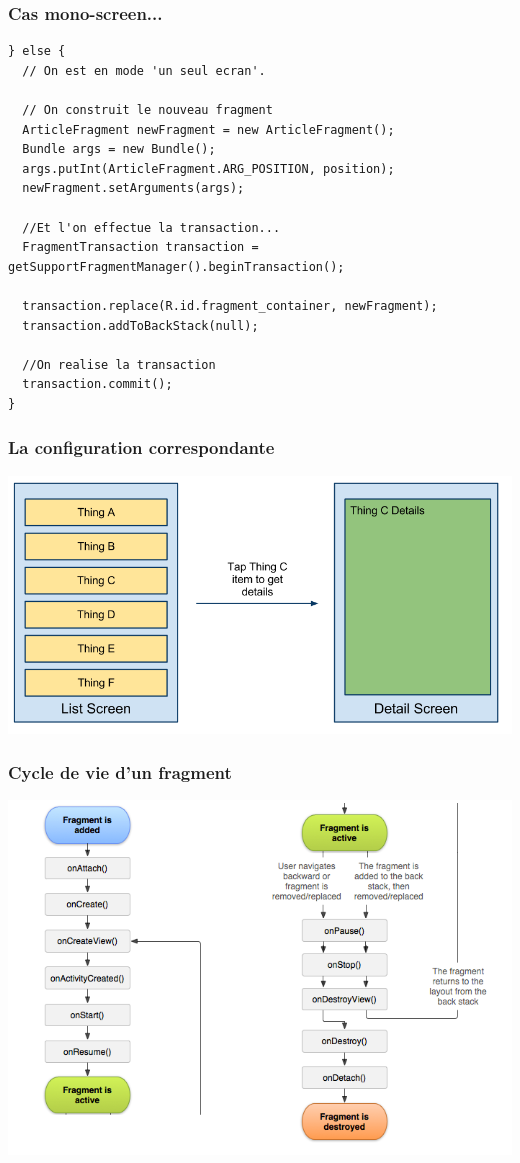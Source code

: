 \documentclass{beamer}
\begin{document}
\begin{frame}[fragile]
\frametitle{Cas mono-screen...}
\begin{lstlisting}
} else {
  // On est en mode 'un seul ecran'.

  // On construit le nouveau fragment
  ArticleFragment newFragment = new ArticleFragment();
  Bundle args = new Bundle();
  args.putInt(ArticleFragment.ARG_POSITION, position);
  newFragment.setArguments(args);

  //Et l'on effectue la transaction...
  FragmentTransaction transaction = getSupportFragmentManager().beginTransaction();

  transaction.replace(R.id.fragment_container, newFragment);
  transaction.addToBackStack(null);

  //On realise la transaction
  transaction.commit();
}
\end{lstlisting}
\end{frame}


\begin{frame}
\frametitle{La configuration correspondante}
\begin{center}
\includegraphics[scale=0.3]{fragments_mono.png}
\end{center}
\end{frame}

\begin{frame}
\frametitle{Cycle de vie d'un fragment}
\begin{center}
\includegraphics[scale=0.4]{fragment_lifecycle.png}
\end{center}
\end{frame}
\end{document}
